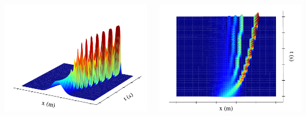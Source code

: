 \begin{frame}
  \begin{columns}
    \begin{center}
      \includegraphics[height=.7\textheight]{../BurgersEquation/images/Leap_Frog_front.pdf}
    \end{center}
    \begin{center}
      \includegraphics[height=.7\textheight]{../BurgersEquation/images/Leap_Frog_top.pdf}
    \end{center}
  \end{columns}
\end{frame}
